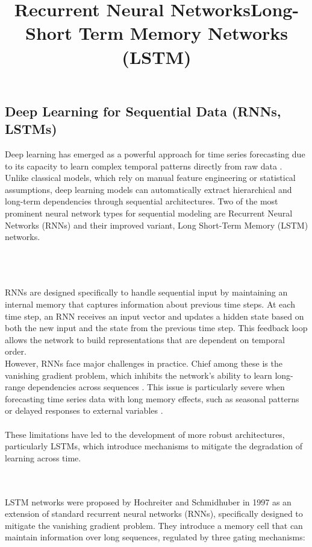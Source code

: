\documentclass{article}
\begin{document}
\subsection{Deep Learning for Sequential Data (RNNs, LSTMs)}
Deep learning has emerged as a powerful approach for time series forecasting due to its capacity to learn complex temporal patterns directly from raw data \cite{ghojogh2023rnnsurvey}. Unlike classical models, which rely on manual feature engineering or statistical assumptions, deep learning models can automatically extract hierarchical and long-term dependencies through sequential architectures. Two of the most prominent neural network types for sequential modeling are Recurrent Neural Networks (RNNs) and their improved variant, Long Short-Term Memory (LSTM) networks.\\
\\
\title{\textbf{Recurrent Neural Networks}}\\
\\
RNNs are designed specifically to handle sequential input by maintaining an internal memory that captures information about previous time steps. At each time step, an RNN receives an input vector and updates a hidden state based on both the new input and the state from the previous time step. This feedback loop allows the network to build representations that are dependent on temporal order.
\\
However, RNNs face major challenges in practice. Chief among these is the vanishing gradient problem, which inhibits the network's ability to learn long-range dependencies across sequences \cite{garg2022machine,mdpi2021gradient}. This issue is particularly severe when forecasting time series data with long memory effects, such as seasonal patterns or delayed responses to external variables \cite{garg2022machine,ghojogh2023rnnsurvey}.\\
\\
These limitations have led to the development of more robust architectures, particularly LSTMs, which introduce mechanisms to mitigate the degradation of learning across time.\\
\\
\title{\textbf{Long-Short Term Memory Networks (LSTM)}}\\
LSTM networks were proposed by Hochreiter and Schmidhuber in 1997 as an extension of standard recurrent neural networks (RNNs), specifically designed to mitigate the vanishing gradient problem. They introduce a memory cell that can maintain information over long sequences, regulated by three gating mechanisms:
\end{document}
